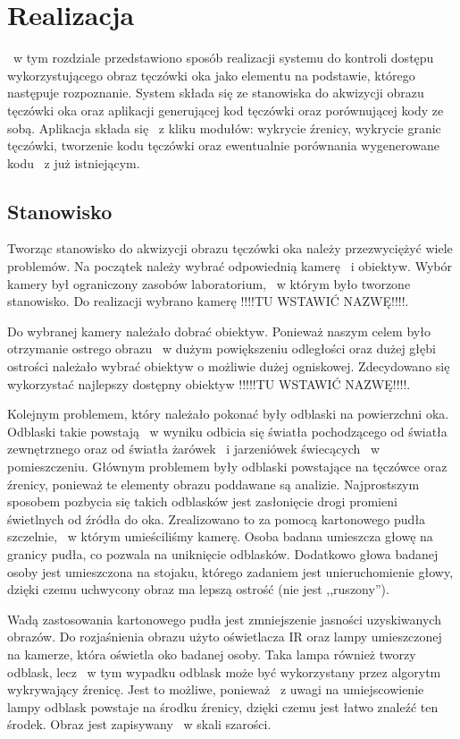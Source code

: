 \chapter{Realizacja}
\label{cha:realizacja}
~w tym rozdziale przedstawiono sposób realizacji systemu do kontroli dostępu wykorzystującego obraz tęczówki oka jako elementu na podstawie, którego następuje rozpoznanie. System składa się ze stanowiska do akwizycji obrazu tęczówki oka oraz aplikacji generującej kod tęczówki oraz porównującej kody ze sobą. Aplikacja składa się ~z kliku modułów: wykrycie źrenicy, wykrycie granic tęczówki, tworzenie kodu tęczówki oraz ewentualnie porównania wygenerowane kodu ~z już istniejącym.

\section{Stanowisko}
\label{sec:stanowisko}
Tworząc stanowisko do akwizycji obrazu tęczówki oka należy przezwyciężyć wiele problemów. Na początek należy wybrać odpowiednią kamerę ~i obiektyw. Wybór kamery był ograniczony zasobów laboratorium, ~w którym było tworzone stanowisko. Do realizacji wybrano kamerę !!!!TU WSTAWIĆ NAZWĘ!!!!.

Do wybranej kamery należało dobrać obiektyw. Ponieważ naszym celem było otrzymanie ostrego obrazu ~w dużym powiększeniu odległości oraz dużej głębi ostrości należało wybrać obiektyw o możliwie dużej ogniskowej. Zdecydowano się wykorzystać najlepszy dostępny obiektyw !!!!!TU WSTAWIĆ NAZWĘ!!!!.

Kolejnym problemem, który należało pokonać były odblaski na powierzchni oka. Odblaski takie powstają ~w wyniku odbicia się światła pochodzącego od światła zewnętrznego oraz od światła żarówek ~i jarzeniówek świecących ~w pomieszczeniu. Głównym problemem były odblaski powstające na tęczówce oraz źrenicy, ponieważ te elementy obrazu poddawane są analizie. Najprostszym sposobem pozbycia się takich odblasków jest zasłonięcie drogi promieni świetlnych od źródła do oka. Zrealizowano to za pomocą kartonowego pudła szczelnie, ~w którym umieściliśmy kamerę. Osoba badana umieszcza głowę na granicy pudła, co pozwala na uniknięcie odblasków. Dodatkowo głowa badanej osoby jest umieszczona na stojaku, którego zadaniem jest unieruchomienie głowy, dzięki czemu uchwycony obraz ma lepszą ostrość (nie jest ,,ruszony'').

Wadą zastosowania kartonowego pudła jest zmniejszenie jasności uzyskiwanych obrazów. Do rozjaśnienia obrazu użyto oświetlacza IR oraz lampy umieszczonej na kamerze, która oświetla oko badanej osoby. Taka lampa również tworzy odblask, lecz ~w tym wypadku odblask może być wykorzystany przez algorytm wykrywający źrenicę. Jest to możliwe, ponieważ ~z uwagi na umiejscowienie lampy odblask powstaje na środku źrenicy, dzięki czemu jest łatwo znaleźć ten środek. Obraz jest zapisywany ~w skali szarości.

